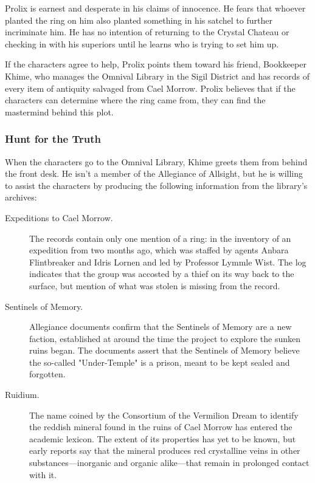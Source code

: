 \documentclass[a4paper, 11pt, bg=full, twocolumn, nooutline]{dndbook}
\begin{document}
Prolix is earnest and desperate in his claims of innocence. He fears that whoever planted the ring on him also planted something in his satchel to further incriminate him. He has no intention of returning to the Crystal Chateau or checking in with his superiors until he learns who is trying to set him up.

If the characters agree to help, Prolix points them toward his friend, Bookkeeper Khime, who manages the Omnival Library in the Sigil District and has records of every item of antiquity salvaged from Cael Morrow. Prolix believes that if the characters can determine where the ring came from, they can find the mastermind behind this plot.

\subsubsection{Hunt for the Truth}

When the characters go to the Omnival Library, Khime greets them from behind the front desk. He isn't a member of the Allegiance of Allsight, but he is willing to assist the characters by producing the following information from the library's archives:


\begin{description}
\item[Expeditions to Cael Morrow.] The records contain only one mention of a ring: in the inventory of an expedition from two months ago, which was staffed by agents Anbara Flintbreaker and Idris Lornen and led by Professor Lymmle Wist. The log indicates that the group was accosted by a thief on its way back to the surface, but mention of what was stolen is missing from the record.
\item[Sentinels of Memory.] Allegiance documents confirm that the Sentinels of Memory are a new faction, established at around the time the project to explore the sunken ruins began. The documents assert that the Sentinels of Memory believe the so-called "Under-Temple" is a prison, meant to be kept sealed and forgotten.
\item[Ruidium.] The name coined by the Consortium of the Vermilion Dream to identify the reddish mineral found in the ruins of Cael Morrow has entered the academic lexicon. The extent of its properties has yet to be known, but early reports say that the mineral produces red crystalline veins in other substances---inorganic and organic alike---that remain in prolonged contact with it.
\end{description}
\end{document}

